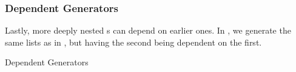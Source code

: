 \subsubsection{Dependent Generators}\label{subsubsec:Dependent_Generators}
Lastly, more deeply nested s can depend on earlier ones.
In , we generate the same lists as in , but having the second  being dependent on the first.
\begin{listing}[h!tbp]
\caption{Dependent Generators}
\label{lst:Dependent_Generators}
\end{listing}

